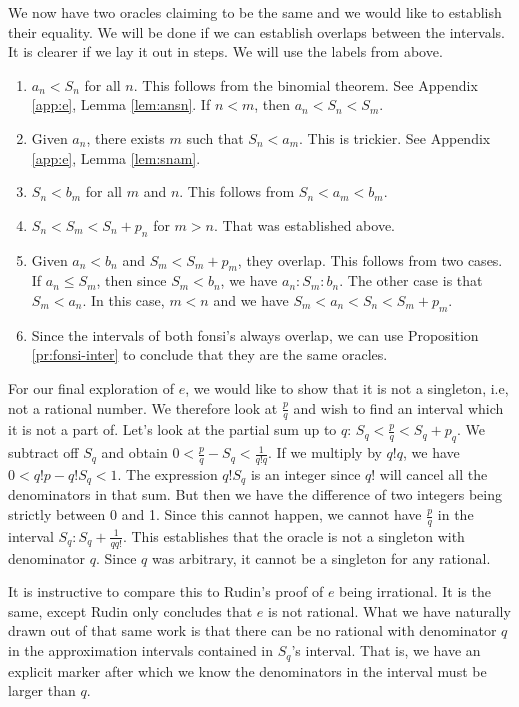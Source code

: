 \documentclass[12pt]{article}
\theoremstyle{remark}
\begin{document}
We now have two oracles claiming to be the same and we would like to establish their equality. We will be done if we can establish overlaps between the intervals. It is clearer if we lay it out in steps. We will use the labels from above. 
\begin{enumerate}
    \item $a_n < S_n$ for all $n$. This follows from the binomial theorem. See Appendix \ref{app:e}, Lemma \ref{lem:ansn}. If $n < m$, then $a_n < S_n < S_m$.
    \item Given $a_n$, there exists $m$ such that $S_n < a_m$. This is trickier. See Appendix \ref{app:e}, Lemma \ref{lem:snam}. 
    \item $S_n < b_m$ for all $m$ and $n$. This follows from $S_n < a_m < b_m$.
    \item $S_n < S_m < S_n + p_n$ for $m > n$. That was established above. 
    \item Given $a_n < b_n$ and $S_m < S_m + p_m$, they overlap. This follows from two cases. If $a_n \leq S_m$, then since $S_m < b_n$, we have $a_n : S_m : b_n$. The other case is that $S_m < a_n$. In this case, $m < n$ and we have $S_m < a_n < S_n < S_m + p_m$. 
    \item Since the intervals of both fonsi's always overlap, we can use Proposition \ref{pr:fonsi-inter} to conclude that they are the same oracles. 
\end{enumerate}

For our final exploration of $e$, we would like to show that it is not a singleton, i.e, not a rational number. We therefore look at $\tfrac{p}{q}$ and wish to find an interval which it is not a part of.  Let's look at the partial sum up to $q$:  $S_q < \tfrac{p}{q} <  S_q + p_q$. We subtract off $S_q$ and obtain $0 < \tfrac{p}{q} - S_q < \tfrac{1}{q! q}$. If we multiply by $q! q$, we have $0 < q! p - q!S_q < 1$.  The expression $q! S_q$ is an integer since $q!$ will cancel all the denominators in that sum. But then we have the difference of two integers being strictly between 0 and 1. Since this cannot happen, we cannot have $\tfrac{p}{q}$ in the interval $S_q : S_q + \frac{1}{q q!}$. This establishes that the oracle is not a singleton with denominator $q$. Since $q$ was arbitrary, it cannot be a singleton for any rational. 

It is instructive to compare this to Rudin's proof of $e$ being irrational. It is the same, except Rudin only concludes that $e$ is not rational. What we have naturally drawn out of that same work is that there can be no rational with denominator $q$ in the approximation intervals contained in $S_q$'s interval. That is, we have an explicit marker after which we know the denominators in the interval must be larger than $q$. 
\end{document}

